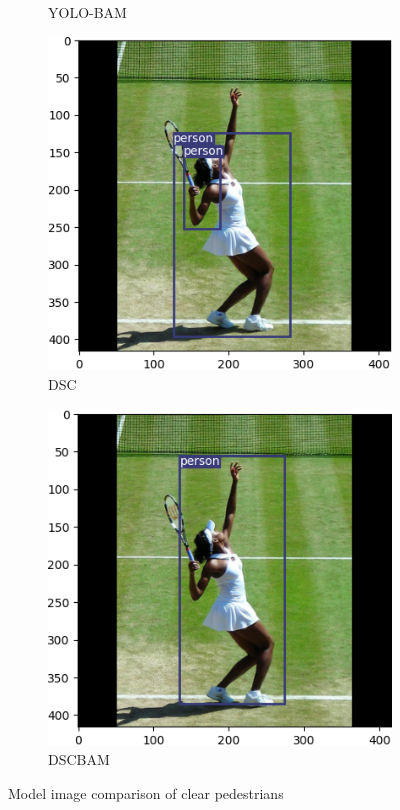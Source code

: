 \begin{figure}[!htbp]
\begin{subfigure}{.2\textwidth}
  \caption{YOLO-BAM}
  \label{fig:cbamtennis}
\end{subfigure}%
\begin{subfigure}{.2\textwidth}
  \centering
  \includegraphics[width=\textwidth]{images/DSC_tennis.png}
  \caption{DSC}
  \label{fig:dsctennis}
\end{subfigure}%
\begin{subfigure}{.2\textwidth}
  \centering
  \includegraphics[width=\textwidth]{images/DSCBAM_tennis.png}
  \caption{DSCBAM}
  \label{fig:dscbamtennis}
\end{subfigure}
\caption{Model image comparison of clear pedestrians}
\label{fig:tennis}
\end{figure}

